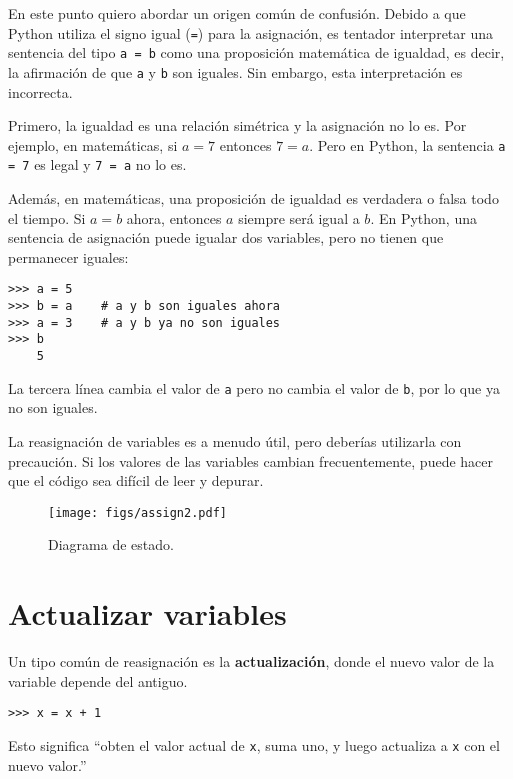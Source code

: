 \documentclass[10pt]{book}
\begin{document}
En este punto quiero abordar un origen común de
confusión.
Debido a que Python utiliza el signo igual ({\tt =}) para la asignación, es
tentador interpretar una sentencia del tipo {\tt a = b} como una
proposición
matemática de igualdad, es decir, la afirmación de que {\tt a} y
{\tt b} son iguales.  Sin embargo, esta interpretación es incorrecta.

Primero, la igualdad es una relación simétrica y la asignación no lo es.  Por
ejemplo, en matemáticas, si $a=7$ entonces $7=a$.  Pero en Python, la
sentencia {\tt a = 7} es legal y {\tt 7 = a} no lo es.

Además, en matemáticas, una proposición de igualdad es verdadera o
falsa todo el tiempo.  Si $a=b$ ahora, entonces $a$ siempre será igual a $b$.
En Python, una sentencia de asignación puede igualar dos variables, pero
no tienen que permanecer iguales:

\begin{verbatim}
>>> a = 5
>>> b = a    # a y b son iguales ahora
>>> a = 3    # a y b ya no son iguales
>>> b
    5
\end{verbatim}
%
La tercera línea cambia el valor de {\tt a} pero no cambia el
valor de {\tt b}, por lo que ya no son iguales.

La reasignación de variables es a menudo útil, pero deberías utilizarla
con precaución.  Si los valores de las variables cambian frecuentemente, puede
hacer que el código sea difícil de leer y depurar.

\begin{figure}
\centerline
{\texttt{[image: figs/assign2.pdf]}}
\caption{Diagrama de estado.}
\label{fig.assign2}
\end{figure}



\section{Actualizar variables}
\label{update}


Un tipo común de reasignación es la {\bf actualización},
donde el nuevo valor de la variable depende del antiguo.

\begin{verbatim}
>>> x = x + 1
\end{verbatim}
%
Esto significa ``obten el valor actual de {\tt x}, suma uno, y luego
actualiza a {\tt x} con el nuevo valor.''
\end{document}
